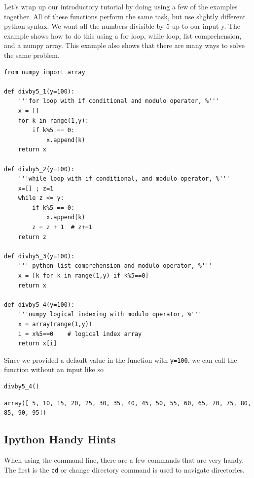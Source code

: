 \documentclass[%
oneside,                 %
final,                   %
10pt]{article}
\begin{document}
Let's wrap up our introductory tutorial by doing using a few of the examples together. All of these functions perform the same task, but use slightly different python syntax. We want all the numbers divisible by 5 up to our input y. The example shows how to do this using a for loop, while loop, list comprehension, and a numpy array. This example also shows that there are many ways to solve the same problem.

\begin{Verbatim}[numbers=none,fontsize=\fontsize{9pt}{9pt},baselinestretch=0.95,xleftmargin=2mm]
from numpy import array

def divby5_1(y=100):
    '''for loop with if conditional and modulo operator, %'''
    x = []
    for k in range(1,y):
        if k%5 == 0:
            x.append(k)
    return x

def divby5_2(y=100):
    '''while loop with if conditional, and modulo operator, %'''
    x=[] ; z=1
    while z <= y:
        if k%5 == 0:
            x.append(k)
        z = z + 1  # z+=1
    return z

def divby5_3(y=100):
    ''' python list comprehension and modulo operator, %'''
    x = [k for k in range(1,y) if k%5==0]
    return x

def divby5_4(y=100):
    '''numpy logical indexing with modulo operator, %'''
    x = array(range(1,y))
    i = x%5==0    # logical index array
    return x[i]
\end{Verbatim}

Since we provided a default value in the function with \texttt{y=100}, we can call the function without an input like so

\begin{Verbatim}[numbers=none,fontsize=\fontsize{9pt}{9pt},baselinestretch=0.95,xleftmargin=2mm]
divby5_4()
\end{Verbatim}

\begin{Verbatim}[numbers=none,fontsize=\fontsize{9pt}{9pt},baselinestretch=0.95,xleftmargin=2mm]
array([ 5, 10, 15, 20, 25, 30, 35, 40, 45, 50, 55, 60, 65, 70, 75, 80, 85, 90, 95])
\end{Verbatim}

\subsection{Ipython Handy Hints}

When using the command line, there are a few commands that are very handy. The first is the \texttt{cd} or change directory command is used to navigate directories.
\end{document}
